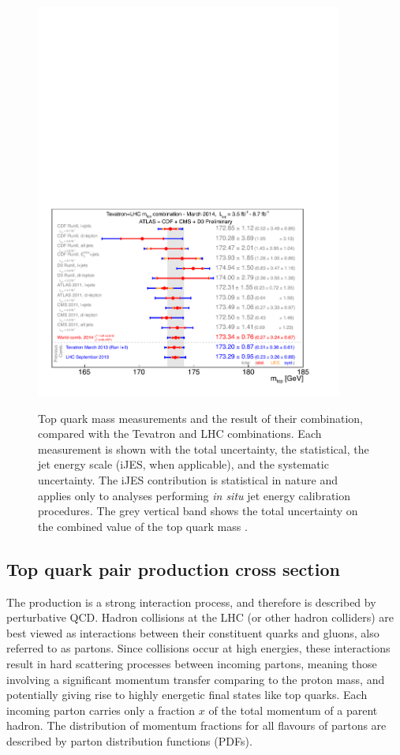 \begin{figure}[hbtp]
   \centering
   {\includegraphics[width=0.9\textwidth]{top_world_combination}}
   \caption[World combination of the top quark mass measurements.]{Top quark mass measurements and the result of their
   combination, compared with the Tevatron and LHC combinations. Each measurement is shown with the total uncertainty,
   the statistical, the jet energy scale (iJES, when applicable), and the systematic uncertainty. The iJES contribution
   is statistical in nature and applies only to analyses performing \textit{in situ} jet energy calibration procedures.
   The grey vertical band shows the total uncertainty on the combined value of the top quark mass
   \autocite{world_top_mass_combination}.}
   \label{fig:top_mass_world_combination}
\end{figure}

\subsection{Top quark pair production cross section}
\label{ss:ttbar_cross_section}
The \ttbar production is a strong interaction process, and therefore is described by perturbative QCD. Hadron collisions
at the LHC (or other hadron colliders) are best viewed as interactions between their constituent quarks and gluons, also
referred to as partons. Since collisions occur at high energies, these interactions result in hard scattering processes
between incoming partons, meaning those involving a significant momentum transfer comparing to the proton mass, and
potentially giving rise to highly energetic final states like top quarks. Each incoming parton carries only a fraction
$x$ of the total momentum of a parent hadron. The distribution of momentum fractions for all flavours of partons are
described by parton distribution functions (PDFs).

